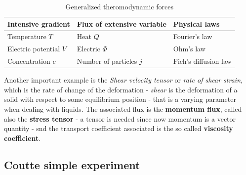 \documentclass[../main/main.tex]{subfiles}
\begin{document}
\begin{table}[h!]
    \centering
    \caption{Generalized theromodynamic forces}
    \label{generalized theromodynamic forces}
    \begin{tabular}{l|l|l}
    Intensive gradient & Flux of extensive variable & Physical laws \\ \hline
    Temperature $T$ & Heat $Q$ & Fourier's law \\
    Electric potential $V$ & Electric $\Phi$ & Ohm's law \\
    Concentration $c$ & Number of particles $j$ & Fich's diffusion law
    \end{tabular}%
\end{table}
Another important example is the \emph{Shear velocity tensor} or \emph{rate of shear strain}, which is the rate of change of the deformation - \emph{shear} is the deformation of a solid with respect to some equilibrium position - that is a varying parameter when dealing with liquids. The associated flux is the \textbf{momentum flux}, called also the \textbf{stress tensor} - a tensor is needed since now momentum is a vector quantity - snd the transport coefficient associated is the so called \textbf{viscosity coefficient}.

\subsection{Coutte simple experiment}
\end{document}
